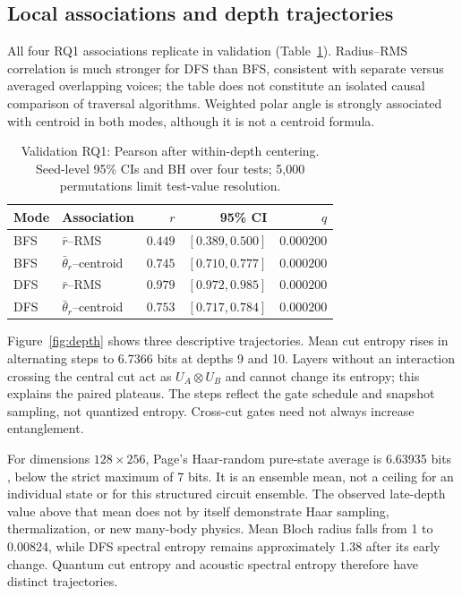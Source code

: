 \documentclass[pdflatex,iicol,sn-basic,Numbered]{sn-jnl}
\begin{document}
\subsection{Local associations and depth trajectories}
All four RQ1 associations replicate in validation (Table~\ref{tab:rq1}). Radius--RMS correlation is much stronger for DFS than BFS, consistent with separate versus averaged overlapping voices; the table does not constitute an isolated causal comparison of traversal algorithms. Weighted polar angle is strongly associated with centroid in both modes, although it is not a centroid formula.
\begin{table}[t]
\caption{Validation RQ1: Pearson after within-depth centering. Seed-level 95\% CIs and BH over four tests; 5,000 permutations limit test-value resolution.}\label{tab:rq1}
\centering\small
\begin{tabular}{llrrr}
\toprule
Mode & Association & $r$ & 95\% CI & $q$ \\
\midrule
BFS & $\bar r$--RMS & $0.449$ & $[0.389, 0.500]$ & $0.000200$ \\
BFS & $\bar\theta_r$--centroid & $0.745$ & $[0.710, 0.777]$ & $0.000200$ \\
DFS & $\bar r$--RMS & $0.979$ & $[0.972, 0.985]$ & $0.000200$ \\
DFS & $\bar\theta_r$--centroid & $0.753$ & $[0.717, 0.784]$ & $0.000200$ \\
\bottomrule
\end{tabular}
\end{table}


Figure~\ref{fig:depth} shows three descriptive trajectories. Mean cut entropy rises in alternating steps to 6.7366 bits at depths 9 and 10. Layers without an interaction crossing the central cut act as $U_A\otimes U_B$ and cannot change its entropy; this explains the paired plateaus. The steps reflect the gate schedule and snapshot sampling, not quantized entropy. Cross-cut gates need not always increase entanglement.

For dimensions $128\times256$, Page's Haar-random pure-state average is 6.63935 bits \citep{Page1993}, below the strict maximum of 7 bits. It is an ensemble mean, not a ceiling for an individual state or for this structured circuit ensemble. The observed late-depth value above that mean does not by itself demonstrate Haar sampling, thermalization, or new many-body physics. Mean Bloch radius falls from 1 to 0.00824, while DFS spectral entropy remains approximately 1.38 after its early change. Quantum cut entropy and acoustic spectral entropy therefore have distinct trajectories.
\end{document}
